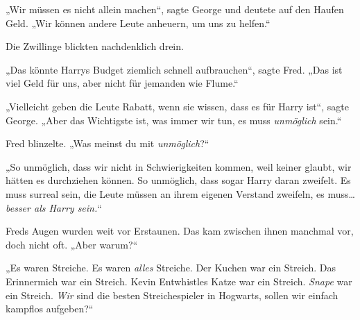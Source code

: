 „Wir müssen es nicht allein machen“, sagte George und deutete auf den Haufen Geld. „Wir können andere Leute anheuern, um uns zu helfen.“

Die Zwillinge blickten nachdenklich drein.

„Das könnte Harrys Budget ziemlich schnell aufbrauchen“, sagte Fred. „Das ist viel Geld für uns, aber nicht für jemanden wie Flume.“

„Vielleicht geben die Leute Rabatt, wenn sie wissen, dass es für Harry ist“, sagte George. „Aber das Wichtigste ist, was immer wir tun, es muss \emph{unmöglich} sein.“

Fred blinzelte. „Was meinst du mit \emph{unmöglich}?“

„So unmöglich, dass wir nicht in Schwierigkeiten kommen, weil keiner glaubt, wir hätten es durchziehen können. So unmöglich, dass sogar Harry daran zweifelt. Es muss surreal sein, die Leute müssen an ihrem eigenen Verstand zweifeln, es muss…\emph{besser als Harry sein.}“

Freds Augen wurden weit vor Erstaunen. Das kam zwischen ihnen manchmal vor, doch nicht oft. „Aber warum?“

„Es waren Streiche. Es waren \emph{alles} Streiche. Der Kuchen war ein Streich. Das Erinnermich war ein Streich. Kevin Entwhistles Katze war ein Streich. \emph{Snape} war ein Streich. \emph{Wir} sind die besten Streichespieler in Hogwarts, sollen wir einfach kampflos aufgeben?“

